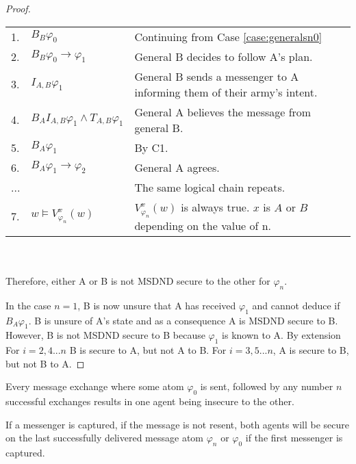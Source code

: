 \begin{proof}
\begin{table}[h!]
\centering
\small
\begin{tabularx}{\linewidth}{l l X}
1. & $B_{B} \varphi_0$ & Continuing from Case \ref{case:generalsn0} \\
2. & $B_{B} \varphi_0 \rightarrow \varphi_1$ & General B decides to follow A's plan. \\
3. & $I_{A,B} \varphi_1$ & General B sends a messenger to A informing them of their army's intent. \\
4. & $B_{A}I_{A,B} \varphi_1 \wedge T_{A,B} \varphi_1$ & General A believes the message from general B. \\
5. & $B_{A}\varphi_1$ & By C1. \\
6. & $B_{A}\varphi_1 \rightarrow \varphi_2$ & General A agrees. \\
...& & The same logical chain repeats. \\
7. & $w \vDash V_{\varphi_n}^{x}(w)$ & $V_{\varphi_n}^{x}(w)$ is always true. $x$ is $A$ or $B$ depending on the value of n. %
\end{tabularx} \\~\\
Therefore, either A or B is not MSDND secure to the other for $\varphi_n$.
\label{tab:twoarmiesproof2}
\end{table}

In the case $n=1$, B is now unsure that A has received $\varphi_1$ and cannot deduce if $B_{A} \varphi_1$. B is unsure of A's state and as a consequence A is MSDND secure to B. However, B is not MSDND secure to B because $\varphi_1$ is known to A. By extension For $i=2,4...n$ B is secure to A, but not A to B. For $i=3,5...n$, A is secure to B, but not B to A.
\end{proof}

\begin{cor}
Every message exchange where some atom $\varphi_0$ is sent, followed by any number $n$ successful exchanges results in one agent being insecure to the other.
\end{cor}

\begin{thm}
If a messenger is captured, if the message is not resent, both agents will be secure on the last successfully delivered message atom $\varphi_{n}$ or $\varphi_0$ if the first messenger is captured.
\label{thm:captured}
\end{thm}

